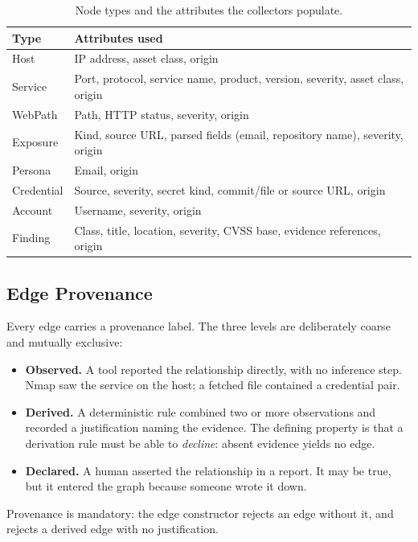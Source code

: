 \documentclass[11pt,a4paper]{article}
\begin{document}
\begin{table}[H]
\centering
\caption{Node types and the attributes the collectors populate.}
\label{tab:nodes}
\small
\begin{tabular}{p{}p{}}
\toprule
Type & Attributes used \\
\midrule
Host & IP address, asset class, origin \\
Service & Port, protocol, service name, product, version, severity, asset class, origin \\
WebPath & Path, HTTP status, severity, origin \\
Exposure & Kind, source URL, parsed fields (email, repository name), severity, origin \\
Persona & Email, origin \\
Credential & Source, severity, secret kind, commit/file or source URL, origin \\
Account & Username, severity, origin \\
Finding & Class, title, location, severity, CVSS base, evidence references, origin \\
\bottomrule
\end{tabular}
\end{table}

\subsection{Edge Provenance}\label{sec:provenance}
Every edge carries a provenance label. The three levels are deliberately coarse and mutually exclusive:

\begin{itemize}[leftmargin=*]
\item \textbf{Observed.} A tool reported the relationship directly, with no inference step. Nmap saw the service on the host; a fetched file contained a credential pair.
\item \textbf{Derived.} A deterministic rule combined two or more observations and recorded a justification naming the evidence. The defining property is that a derivation rule must be able to \emph{decline}: absent evidence yields no edge.
\item \textbf{Declared.} A human asserted the relationship in a report. It may be true, but it entered the graph because someone wrote it down.
\end{itemize}

Provenance is mandatory: the edge constructor rejects an edge without it, and rejects a derived edge with no justification.
\end{document}
